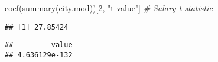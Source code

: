 \documentclass[
]{article}
\newenvironment{Shaded}{\begin{snugshade}}{\end{snugshade}}
\newcommand{\CommentTok}[1]{\textcolor[rgb]{0.56,0.35,0.01}{\textit{#1}}}
\newcommand{\DecValTok}[1]{\textcolor[rgb]{0.00,0.00,0.81}{#1}}
\newcommand{\FunctionTok}[1]{\textcolor[rgb]{0.00,0.00,0.00}{#1}}
\newcommand{\NormalTok}[1]{#1}
\newcommand{\SpecialCharTok}[1]{\textcolor[rgb]{0.00,0.00,0.00}{#1}}
\newcommand{\StringTok}[1]{\textcolor[rgb]{0.31,0.60,0.02}{#1}}
\begin{document}
\begin{Shaded}
\begin{Highlighting}[]
\FunctionTok{coef}\NormalTok{(}\FunctionTok{summary}\NormalTok{(city.mod))[}\DecValTok{2}\NormalTok{, }\StringTok{"t value"}\NormalTok{]   }\CommentTok{\# Salary t{-}statistic}
\end{Highlighting}
\end{Shaded}

\begin{verbatim}
## [1] 27.85424
\end{verbatim}

\begin{Shaded}
\end{Shaded}

\begin{verbatim}
##         value 
## 4.636129e-132
\end{verbatim}
\end{document}

